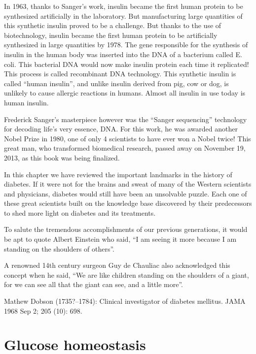 In 1963, thanks to Sanger’s work, insulin became the first human protein to be synthesized artificially in the laboratory. But manu\-factu\-ring large quantities of this synthetic insulin proved to be a challenge. But thanks to the use of biotechnology, insulin became the first human protein to be artificially synthesized in large quantities by 1978. The gene responsible for the synthesis of insulin in the human body was inserted into the DNA of a ba\-cterium called E. coli. This bacterial DNA would now make insulin protein each time it replicated! This process is called recombinant DNA technology. This synthetic insu\-lin is called “human insulin”, and unlike insulin derived from pig, cow or dog, is unlikely to cause allergic reactions in humans. Almost all insu\-lin in use today is human insulin.

Frederick Sanger’s masterpiece however was the “Sanger seque\-ncing” technology for decoding life’s very essence, DNA. For this work, he was awarded another Nobel Prize in 1980, one of only 4 scientists to have ever won a Nobel twice! This great man, who transformed biomedical research, passed away on Nove\-mber 19, 2013, as this book was being finalized.

In this chapter we have reviewed the important landmarks in the history of diabetes. If it were not for the brains and sweat of many of the Western scientists and physicians, diabetes would still have been an unsolvable puzzle. Each one of these great scientists built on the knowledge base discovered by their predecessors to shed more light on diabetes and its treatments.

To salute the tremendous accomplishments of our previous genera\-tions, it would be apt to quote Albert Einstein who said, “I am seeing it more because I am standing on the shoulders of others”.

A renowned 14th century surgeon Guy de Chauliac also acknow\-ledged this concept when he said, “We are like children standing on the shoulders of a giant, for we can see all that the giant can see, and a little more”.

\begin{thebibliography}{99}
 Mathew Dobson (1735?–1784): Clinical investigator of diabetes mellitus. JAMA 1968 Sep 2; 205 (10): 698.
\end{thebibliography}


\chapter{Glucose homeostasis}\label{chap2}

